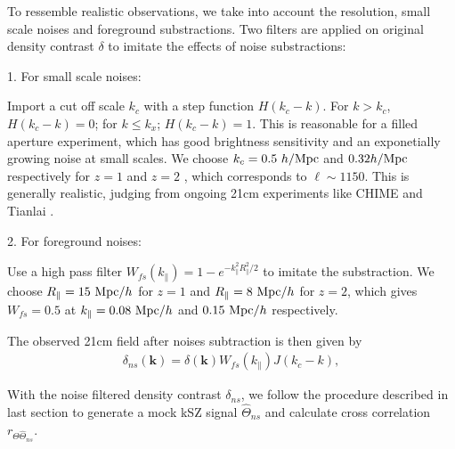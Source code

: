 To ressemble realistic observations, we take into account the resolution, small scale noises and foreground substractions. 
Two filters are applied on original density contrast $\delta$ to imitate the effects of noise substractions:

1. For small scale noises:

Import a cut off scale $k_c$ 
with a step function $H(k_c-k)$. 
For $k>k_c$, $H(k_c-k)=0$; for $k\leqslant k_x$; $H(k_c-k)=1$.
This is reasonable for a filled aperture experiment, which
has good brightness sensitivity and an exponetially growing noise at small 
scales.
We choose $k_c=0.5\ h/\mathrm{Mpc}$ and $0.32 h/\mathrm{Mpc}$ respectively for $z=1$ and $z=2$ , which corresponds
to $\ell\sim1150$. 
This is generally realistic, judging from ongoing 21cm experiments like
CHIME \cite{2014SPIE.9145E..22B}\cite{2014SPIE.9145E..4VN}
and Tianlai \cite{2012IJMPS..12..256C}\cite{2015ApJ...798...40X}.

2. For foreground noises:

Use a high pass filter $W_{fs}(k_\parallel)=1-e^{-k_\parallel^2R_\parallel^2/2}$ to imitate the substraction. 
We choose 
$R_\parallel=15\ \mathrm{Mpc}/h$ for $z=1$ and $R_\parallel=8\ \mathrm{Mpc}/h$ for $z=2$, which gives
$W_{fs}=0.5$ at
$k_\parallel=0.08\ \mathrm{Mpc}/h$ and $0.15\ \mathrm{Mpc}/h$ respectively. 

The observed 21cm field after noises subtraction is then given by 
\begin{eqnarray}
\label{eq:ns}
\delta_{ns}(\bm{k})=\delta(\bm{k})W_{fs}(k_\parallel)J(k_c-k),
\end{eqnarray}

With the noise filtered density contrast $\delta_{ns}$, we follow the procedure described in last section to generate a mock kSZ signal $\hat \Theta_{ns}$  
and calculate cross correlation $r_{\Theta\hat\Theta_{ns}}$.
